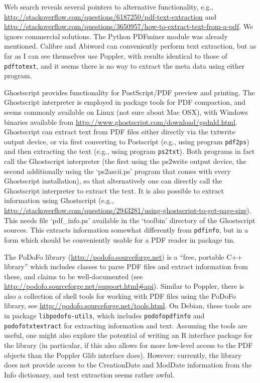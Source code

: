 \documentclass[a4paper]{article}
\newcommand{\file}[1]{`\textsf{#1}'}
\newcommand{\strong}[1]{{\normalfont\fontseries{b}\selectfont #1}}
\let\pkg=\strong
\begin{document}
Web search reveals several pointers to alternative functionality, e.g.,
\url{http://stackoverflow.com/questions/6187250/pdf-text-extraction} and 
\url{http://stackoverflow.com/questions/3650957/how-to-extract-text-from-a-pdf}.
We ignore commercial solutions.  The Python PDFminer module was already
mentioned.  Calibre and Abiword can conveniently perform text
extraction, but as far as I can see themselves use Poppler, with results
identical to those of \verb|pdftotext|, and it seems there is no way to
extract the meta data using either program.

Ghostscript provides functionality for PostScript/PDF preview and
printing.  The Ghostscript interpreter is employed in package
\pkg{tools} for PDF compaction, and seems commonly available on Linux
(not sure about Mac OSX), with Windows binaries available from
\url{http://www.ghostscript.com/download/gsdnld.html}.  Ghostscript can
extract text from PDF files either directly via the txtwrite output
device, or via first converting to Postscript (e.g., using program
\verb|pdf2ps|) and then extracting the text (e.g., using program
\verb|ps2txt|).  Both programs in fact call the Ghostscript interpreter
(the first using the ps2write output device, the second additionally
using the \file{ps2ascii.ps} program that comes with every Ghostscript
installation), so that alternatively one can directly call the
Ghostscript interpreter to extract the text.  It is also possible to
extract information using Ghostscript (e.g.,
\url{http://stackoverflow.com/questions/2943281/using-ghostscript-to-get-page-size}).
This needs file \file{pdf\_info.ps} available in the \file{toolbin}
directory of the Ghostscript sources.  This extracts information
somewhat differently from \verb|pdfinfo|, but in a form which should be
conveniently usable for a PDF reader in package \pkg{tm}.

The PoDoFo library (\url{http://podofo.sourceforge.net}) is a ``free,
portable C++ library'' which includes classes to parse PDF files and
extract information from these, and claims to be well-documented (see
\url{http://podofo.sourceforge.net/support.html#api}).  Similar to
Poppler, there is also a collection of shell tools for working with PDF
files using the PoDoFo library, see
\url{http://podofo.sourceforge.net/tools.html}.  On Debian, these tools
are in package \verb|libpodofo-utils|, which includes
\verb|podofopdfinfo| and \verb|podofotxtextract| for extracting
information and text.  Assuming the tools are useful, one might also
explore the potential of writing an R interface package for the library
(in particular, if this also allows for more low-level access to the PDF
objects than the Poppler Glib interface does).  However: currently,
the library does not provide access to the CreationDate and ModDate
information from the Info dictionary, and text extraction seems rather
awful.
\end{document}
